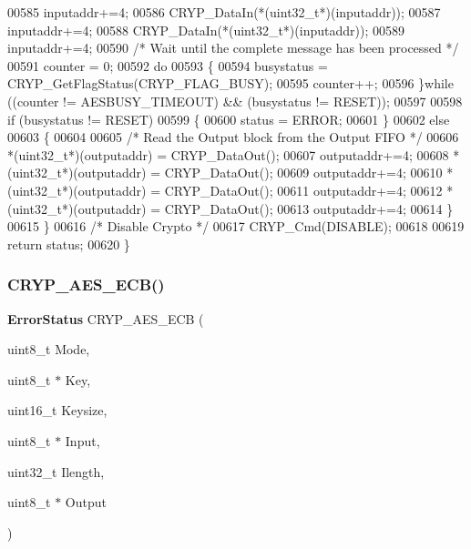 \begin{DoxyCode}
00585     inputaddr+=4;
00586     CRYP_DataIn(*(uint32\_t*)(inputaddr));
00587     inputaddr+=4;
00588     CRYP_DataIn(*(uint32\_t*)(inputaddr));
00589     inputaddr+=4;
00590     \textcolor{comment}{/* Wait until the complete message has been processed */}
00591     counter = 0;
00592     \textcolor{keywordflow}{do}
00593     \{
00594       busystatus = CRYP_GetFlagStatus(CRYP_FLAG_BUSY);
00595       counter++;
00596     \}\textcolor{keywordflow}{while} ((counter != AESBUSY_TIMEOUT) && (busystatus != RESET));
00597 
00598     \textcolor{keywordflow}{if} (busystatus != RESET)
00599    \{
00600        status = ERROR;
00601     \}
00602     \textcolor{keywordflow}{else}
00603     \{
00604 
00605       \textcolor{comment}{/* Read the Output block from the Output FIFO */}
00606       *(uint32\_t*)(outputaddr) = CRYP_DataOut();
00607       outputaddr+=4;
00608       *(uint32\_t*)(outputaddr) = CRYP_DataOut();
00609       outputaddr+=4;
00610       *(uint32\_t*)(outputaddr) = CRYP_DataOut();
00611       outputaddr+=4;
00612       *(uint32\_t*)(outputaddr) = CRYP_DataOut();
00613       outputaddr+=4;
00614     \}
00615   \}
00616   \textcolor{comment}{/* Disable Crypto */}
00617   CRYP_Cmd(DISABLE);
00618 
00619   \textcolor{keywordflow}{return} status;
00620 \}
\end{DoxyCode}
\mbox{\label{group__CRYP__Group6_ga79ff82ece0e9620dc86d6e57abe639e1}} 
\subsubsection{C\+R\+Y\+P\+\_\+\+A\+E\+S\+\_\+\+E\+C\+B()}
{\footnotesize\ttfamily \textbf{ Error\+Status} C\+R\+Y\+P\+\_\+\+A\+E\+S\+\_\+\+E\+CB (\begin{DoxyParamCaption}\item[{uint8\+\_\+t}]{Mode,  }\item[{uint8\+\_\+t $\ast$}]{Key,  }\item[{uint16\+\_\+t}]{Keysize,  }\item[{uint8\+\_\+t $\ast$}]{Input,  }\item[{uint32\+\_\+t}]{Ilength,  }\item[{uint8\+\_\+t $\ast$}]{Output }\end{DoxyParamCaption})}



